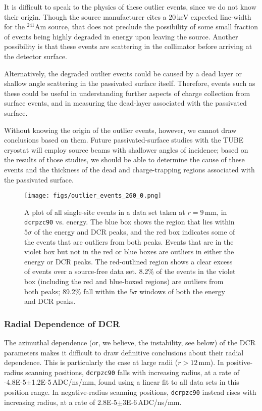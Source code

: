 \documentclass[groupedaddress,rmp,amsmath,amssymb,bibnotes,altaffilletter,twocolumn]{revtex4-1}
\begin{document}
It is difficult to speak to the physics of these outlier events, since we do not know their origin. Though the source manufacturer cites a 20\,keV expected line-width for the $^{241}$Am source, that does not preclude the possibility of some small fraction of events being highly degraded in energy upon leaving the source. Another possibility is that these events are scattering in the collimator before arriving at the detector surface.

Alternatively, the degraded outlier events could be caused by a dead layer or shallow angle scattering in the passivated surface itself. Therefore, events such as these could be useful in understanding further aspects of charge collection from surface events, and in measuring the dead-layer associated with the passivated surface. 

Without knowing the origin of the outlier events, however, we cannot draw conclusions based on them. Future passivated-surface studies with the TUBE cryostat will employ source beams with shallower angles of incidence; based on the results of those studies, we should be able to determine the cause of these events and the thickness of the dead and charge-trapping regions associated with the passivated surface. 

\begin{figure}[]
 \centering
 \texttt{[image: figs/outlier\_events\_260\_0.png]}
 \caption{A plot of all single-site events in a data set taken at $r=9$\,mm, in {\tt dcrpzc90} vs. energy. The blue box shows the region that lies within $5\sigma$ of the energy and DCR peaks, and the red box indicates some of the events that are outliers from both peaks. Events that are in the violet box but not in the red or blue boxes are outliers in either the energy or DCR peaks. The red-outlined region shows a clear excess of events over a source-free data set. 8.2\% of the events in the violet box (including the red and blue-boxed regions) are outliers from both peaks; 89.2\% fall within the $5\sigma$ windows of both the energy and DCR peaks.} 
 \label{fig:outliers}
\end{figure}


\subsubsection{Radial Dependence of DCR}
The azimuthal dependence (or, we believe, the instability, see below) of the DCR parameters makes it difficult to draw definitive conclusions about their radial dependence. This is particularly the case at large radii ($r>12$\,mm). In positive-radius scanning positions, {\tt dcrpzc90} falls with increasing radius, at a rate of -4.8E-5$\pm$1.2E-5\,ADC/ns/mm, found using a linear fit to all data sets in this position range. In negative-radius scanning positions, {\tt dcrpzc90} instead rises with increasing radius, at a rate of 2.8E-5$\pm$3E-6\,ADC/ns/mm. 
\end{document}
